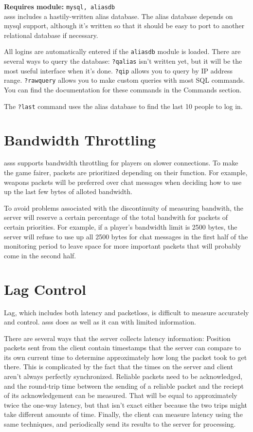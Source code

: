 \documentclass{article}
\newcommand{\requiremod}[1]{\noindent\textbf{Requires module:} \texttt{#1}\\}
\newcommand{\asss}{asss}
\begin{document}
\requiremod{mysql, aliasdb}
\asss{} includes a hastily-written alias database. The alias database
depends on mysql support, although it's written so that it should be
easy to port to another relational database if necessary.

All logins are automatically entered if the \verb/aliasdb/ module is
loaded. There are several ways to query the database: \verb/?qalias/
isn't written yet, but it will be the most useful interface when it's
done. \verb/?qip/ allows you to query by IP address range.
\verb/?rawquery/ allows you to make custom queries with most SQL
commands. You can find the documentation for these commands in the
Commands section.

The \verb/?last/ command uses the alias database to find the last 10
people to log in.


\section{Bandwidth Throttling}

\asss{} supports bandwidth throttling for players on slower connections.
To make the game fairer, packets are prioritized depending on their
function. For example, weapons packets will be preferred over chat
messages when deciding how to use up the last few bytes of alloted
bandwidth.

To avoid problems associated with the discontinuity of measuring
bandwith, the server will reserve a certain percentage of the total
bandwith for packets of certain priorities. For example, if a player's
bandwidth limit is 2500 bytes, the server will refuse to use up all 2500
bytes for chat messages in the first half of the monitoring period to
leave space for more important packets that will probably come in the
second half.



\section{Lag Control}

Lag, which includes both latency and packetloss, is difficult to measure
accurately and control. \asss{} does as well as it can with limited
information.

There are several ways that the server collects latency information:
Position packets sent from the client contain timestamps that the server
can compare to its own current time to determine approximately how long
the packet took to get there. This is complicated by the fact that the
times on the server and client aren't always perfectly synchronized.
Reliable packets need to be acknowledged, and the round-trip time
between the sending of a reliable packet and the reciept of its
acknowledgement can be measured. That will be equal to approximately
twice the one-way latency, but that isn't exact either because the two
trips might take different amounts of time. Finally, the client can
measure latency using the same techniques, and periodically send its
results to the server for processing.
\end{document}

